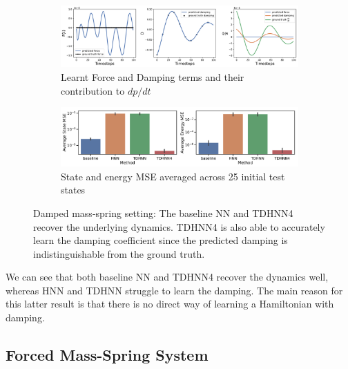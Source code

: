 \documentclass{article}
\begin{document}
\begin{figure}[h!]
\centering
\captionsetup{justification=centering}
	\begin{subfigure}[b]{0.48\textwidth}
		\centering
		\includegraphics[width=\textwidth]{figures/figures/damped/1/damped_dpdt_0.pdf}
		\caption{Learnt Force and Damping terms and their contribution to $dp/dt$}
	\end{subfigure}
	\begin{subfigure}[b]{0.48\textwidth}
	    \centering
		\includegraphics[width=\textwidth]{figures/figures/damped/1/damped_errors_0.pdf}
		\caption{State and energy MSE averaged across 25 initial test states}
	\end{subfigure}
\caption{Damped mass-spring setting: The baseline NN and TDHNN4 recover the underlying dynamics. TDHNN4 is also able to accurately learn the damping coefficient since the predicted damping is indistinguishable from the ground truth.}
\label{damped}
\end{figure}

We can see that both baseline NN and TDHNN4 recover the dynamics well, whereas HNN and TDHNN struggle to learn the damping. The main reason for this latter result is that there is no direct way of learning a Hamiltonian with damping.

\subsection{Forced Mass-Spring System}
\end{document}

